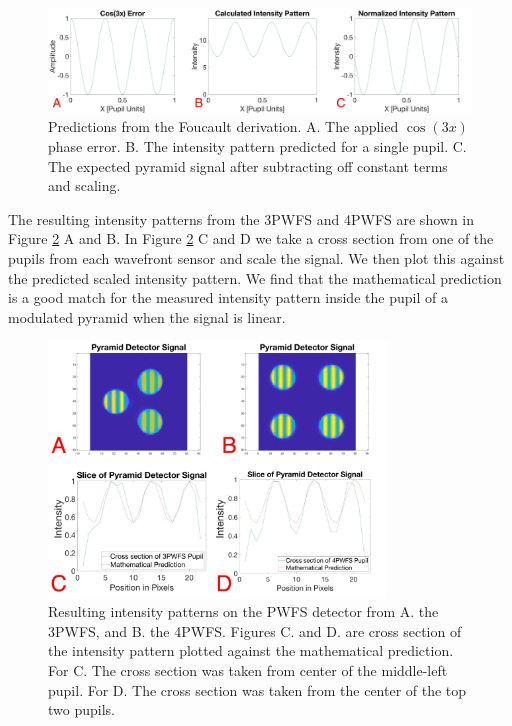 \begin{figure}
    \centering
    \includegraphics[width=1\textwidth]{Chapter Materials/Chapter Two Materials/MathPredictions.png}
    \caption{Predictions from the Foucault derivation. A. The applied $\cos(3x)$ phase error. B. The intensity pattern predicted for a single pupil. C. The expected pyramid signal after subtracting off constant terms and scaling.}
    \label{fig:MathPredicions}
\end{figure}

The resulting intensity patterns from the 3PWFS and 4PWFS are shown in Figure \ref{fig:IntensityPatternsDiagram} A and B. In Figure \ref{fig:IntensityPatternsDiagram} C and D we take a cross section from one of the pupils from each wavefront sensor and scale the signal. We then plot this against the predicted scaled intensity pattern. We find that the mathematical prediction is a good match for the measured intensity pattern inside the pupil of a modulated pyramid when the signal is linear. 


\begin{figure}
    \centering
\includegraphics[width=0.8\textwidth]{Chapter Materials/Chapter Two Materials/IntensityPatternsDiagram.png}
    \caption{Resulting intensity patterns on the PWFS detector from A. the 3PWFS, and B. the 4PWFS. Figures C. and D. are cross section of the intensity pattern plotted against the mathematical prediction. For C. The cross section was taken from center of the middle-left pupil. For D. The cross section was taken from the center of the top two pupils.}
    \label{fig:IntensityPatternsDiagram}
\end{figure}


